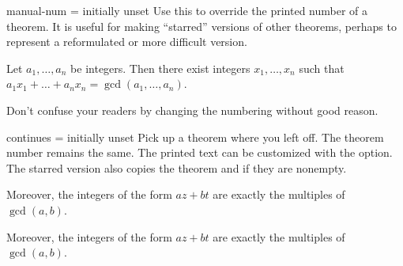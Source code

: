 \documentclass{ltxdoc}
\begin{document}
\begin{docKey}{manual-num}
  {=}
  {initially unset}
Use this to override the printed number of a theorem.
It is useful for making ``starred'' versions of other theorems, perhaps to represent a reformulated or more difficult version.

\begin{keythmscode}
\begin{theorem}[manual-num=\ref*{bezout}*]
Let $a_1,\dots,a_n$ be integers. Then there exist integers $x_1,\dots,x_n$ such that $a_1x_1+\dots+a_nx_n=\gcd(a_1,\dots,a_n)$.
\end{theorem}
\begin{theorem}[manual-num=\faRocket] %
Don't confuse your readers by changing the numbering without good reason.
\end{theorem}
\end{keythmscode}

\end{docKey}
\begin{docKey}{continues}
  {\sarg=}
  {initially unset}
Pick up a theorem where you left off.
The theorem number remains the same.
The printed text can be customized with the  option.
The starred version also copies the theorem  and  if they are nonempty.

\begin{keythmscode}
\begin{theorem}[continues=bezout]
Moreover, the integers of the form $az+bt$ are exactly the multiples of $\gcd(a,b)$.
\end{theorem}
\begin{theorem}[continues*=bezout]
Moreover, the integers of the form $az+bt$ are exactly the multiples of $\gcd(a,b)$.
\end{theorem}
\end{keythmscode}

\end{docKey}
\end{document}
